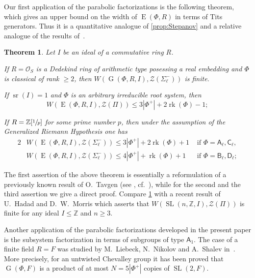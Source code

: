 \documentclass[oneside, 12pt]{amsart}
\theoremstyle{plain}
\newtheorem{thm}{Theorem}
\numberwithin{equation}{section}
\numberwithin{lemma}{section}
\theoremstyle{definition}
\theoremstyle{remark}
\DeclareMathOperator{\G}{G}
\DeclareMathOperator{\SL}{SL}
\DeclareMathOperator{\E}{E}
\DeclareMathOperator{\sr}{sr}
\DeclareMathOperator{\rk}{rk}
\newcommand{\rA}{\mathsf{A}}
\newcommand{\rB}{\mathsf{B}}
\newcommand{\rC}{\mathsf{C}}
\newcommand{\rD}{\mathsf{D}}
\begin{document}

Our first application of the parabolic factorizations is the following theorem, which gives an upper bound on the width of $\E(\Phi, R)$ in terms of Tits generators. Thus it is a quantitative analogue of \cref{prop:Stepanov}
and a relative analogue of the results of~\cite{Tavgen91, VseUnitrZ1p, VavSmSuUnitrEng}.
\begin{thm}\label{thm:width} Let $I$ be an ideal of a commutative ring $R$.
\begin{thmlist}
\item If $R=\mathcal{O}_S$ is a Dedekind ring of arithmetic type posessing a real embedding and $\Phi$ is classical of rank $\geqslant2$, then 
$W(\G(\Phi, R, I), \mathcal{Z}(\Sigma_\ell^-))$ is finite.
\item If $\sr(I) = 1$ and $\Phi$ is an arbitrary irreducible root system, then 
\[W(\E(\Phi, R, I), \mathcal{Z}(\Pi))\leqslant 3|\Phi^+|+2\rk(\Phi)-1;\]
\item If $R = \mathbb{Z}[\sfrac{1}{p}]$ for some prime number $p$, then under the assumption of the Generalized Riemann Hypothesis one has
\begin{alignat*}{2}
& W(\E(\Phi, R, I), \mathcal{Z}(\Sigma_\ell^-))\leqslant 3|\Phi^+| + 2\rk(\Phi) + 1 & \text{ if } \Phi=\rA_\ell, \rC_\ell, \\
& W(\E(\Phi, R, I), \mathcal{Z}(\Sigma_\ell^-))\leqslant 4|\Phi^+| + \rk(\Phi) + 1 & \text{ if } \Phi=\rB_\ell, \rD_\ell;
\end{alignat*}
\end{thmlist}
\end{thm}
The first assertion of the above theorem is essentially a reformulation of a previously known result of O.~Tavgen (see \cite{TavgenThesis}, cf.~\cite{Mo07}), 
while for the second and the third assertion we give a direct proof.
Compare \cref{thm:width} with a recent result of U.~Hadad and D.~W.~Morris \cite[Theorem~1.6]{Ha12} which asserts that 
$W(\SL(n, \mathbb{Z}, I), \mathcal{Z}(\Pi))$ is finite for any ideal $I \leq \mathbb{Z}$ and $n \geq 3$.

Another application of the parabolic factorizations developed in the present paper is the subsystem factorization in terms of subgroups of type $\rA_1$.
The case of a finite field $R=F$ was studied by M.~Liebeck, N.~Nikolov and A.~Shalev in~\cite{LNS11}.
More precisely, for an untwisted Chevalley group it has been proved that $\G(\Phi, F)$ is a product of at most $N=5|\Phi^+|$ copies of $\SL(2, F)$.
\end{document}
